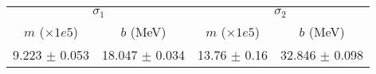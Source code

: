 \begin{tabular}{cc|cc}
\multicolumn{2}{c|}{$\sigma_1$} & \multicolumn{2}{|c}{$\sigma_2$} \\
$m$ ($\times1e5$) & $b$ (MeV) & $m$ ($\times1e5$) & $b$ (MeV) \\
\hline
9.223 $\pm$ 0.053 & 18.047 $\pm$ 0.034 & 13.76 $\pm$ 0.16 & 32.846 $\pm$ 0.098\\
\end{tabular}

